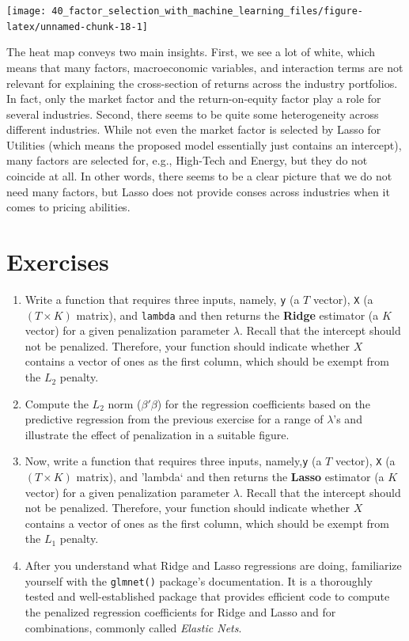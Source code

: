 \documentclass[
]{krantz}
\providecommand{\tightlist}{%
  \setlength{\itemsep}{0pt}\setlength{\parskip}{0pt}}
\begin{document}
\begin{center}\texttt{[image: 40\_factor\_selection\_with\_machine\_learning\_files/figure-latex/unnamed-chunk-18-1]} \end{center}

The heat map conveys two main insights. First, we see a lot of white, which means that many factors, macroeconomic variables, and interaction terms are not relevant for explaining the cross-section of returns across the industry portfolios. In fact, only the market factor and the return-on-equity factor play a role for several industries. Second, there seems to be quite some heterogeneity across different industries. While not even the market factor is selected by Lasso for Utilities (which means the proposed model essentially just contains an intercept), many factors are selected for, e.g., High-Tech and Energy, but they do not coincide at all. In other words, there seems to be a clear picture that we do not need many factors, but Lasso does not provide conses across industries when it comes to pricing abilities.

\hypertarget{exercises-7}{%
\section{Exercises}\label{exercises-7}}

\begin{enumerate}
\def\labelenumi{\arabic{enumi}.}
\tightlist
\item
  Write a function that requires three inputs, namely, \texttt{y} (a \(T\) vector), \texttt{X} (a \((T \times K)\) matrix), and \texttt{lambda} and then returns the \textbf{Ridge} estimator (a \(K\) vector) for a given penalization parameter \(\lambda\). Recall that the intercept should not be penalized. Therefore, your function should indicate whether \(X\) contains a vector of ones as the first column, which should be exempt from the \(L_2\) penalty.
\item
  Compute the \(L_2\) norm (\(\beta'\beta\)) for the regression coefficients based on the predictive regression from the previous exercise for a range of \(\lambda\)'s and illustrate the effect of penalization in a suitable figure.
\item
  Now, write a function that requires three inputs, namely,\texttt{y} (a \(T\) vector), \texttt{X} (a \((T \times K)\) matrix), and 'lambda` and then returns the \textbf{Lasso} estimator (a \(K\) vector) for a given penalization parameter \(\lambda\). Recall that the intercept should not be penalized. Therefore, your function should indicate whether \(X\) contains a vector of ones as the first column, which should be exempt from the \(L_1\) penalty.
\item
  After you understand what Ridge and Lasso regressions are doing, familiarize yourself with the \texttt{glmnet()} package's documentation. It is a thoroughly tested and well-established package that provides efficient code to compute the penalized regression coefficients for Ridge and Lasso and for combinations, commonly called \emph{Elastic Nets}.
\end{enumerate}
\end{document}
